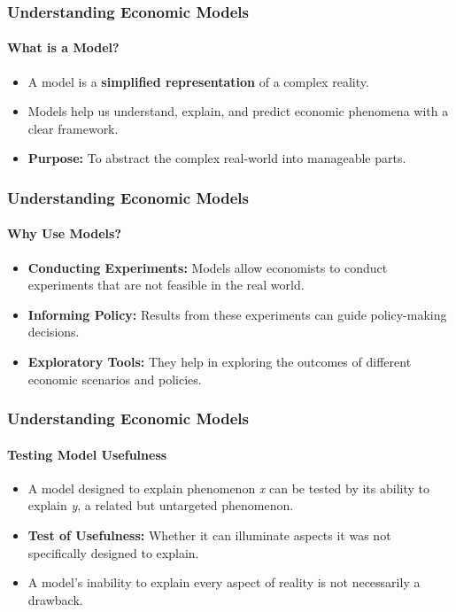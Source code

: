 \documentclass{beamer}
\begin{document}
\begin{frame}
    \frametitle{Understanding Economic Models}
    \framesubtitle{What is a Model?}
        \begin{itemize}
            \item A model is a \textbf{simplified representation} of a complex reality.
            \item Models help us understand, explain, and predict economic phenomena with a clear framework.
            \item \textbf{Purpose:} To abstract the complex real-world into manageable parts.
        \end{itemize}
    \end{frame}

    \begin{frame}
        \frametitle{Understanding Economic Models}
        \framesubtitle{Why Use Models?}
            \begin{itemize}
                \item \textbf{Conducting Experiments:} Models allow economists to conduct experiments that are not feasible in the real world.
                \item \textbf{Informing Policy:} Results from these experiments can guide policy-making decisions.
                \item \textbf{Exploratory Tools:} They help in exploring the outcomes of different economic scenarios and policies.
            \end{itemize}
        \end{frame}
        
        \begin{frame}
            \frametitle{Understanding Economic Models}
            \framesubtitle{Testing Model Usefulness}
                \begin{itemize}
                    \item A model designed to explain phenomenon \textit{x} can be tested by its ability to explain \textit{y}, a related but untargeted phenomenon.
                    \item \textbf{Test of Usefulness:} Whether it can illuminate aspects it was not specifically designed to explain.
                    \item A model's inability to explain every aspect of reality is not necessarily a drawback.
                \end{itemize}
            \end{frame}
\end{document}
